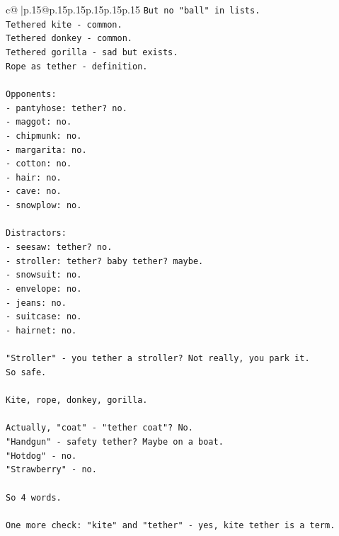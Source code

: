 \documentclass{article}
\begin{document}
{\begin{supertabular}{c@{$\;$}|p{.15\linewidth}@{}p{.15\linewidth}p{.15\linewidth}p{.15\linewidth}p{.15\linewidth}p{.15\linewidth}}
{{{\texttt{But no "ball" in lists.} \\
\texttt{Tethered kite {-} common.} \\
\texttt{Tethered donkey {-} common.} \\
\texttt{Tethered gorilla {-} sad but exists.} \\
\texttt{Rope as tether {-} definition.} \\
\\ 
\texttt{Opponents:} \\
\texttt{{-} pantyhose: tether? no.} \\
\texttt{{-} maggot: no.} \\
\texttt{{-} chipmunk: no.} \\
\texttt{{-} margarita: no.} \\
\texttt{{-} cotton: no.} \\
\texttt{{-} hair: no.} \\
\texttt{{-} cave: no.} \\
\texttt{{-} snowplow: no.} \\
\\ 
\texttt{Distractors:} \\
\texttt{{-} seesaw: tether? no.} \\
\texttt{{-} stroller: tether? baby tether? maybe.} \\
\texttt{{-} snowsuit: no.} \\
\texttt{{-} envelope: no.} \\
\texttt{{-} jeans: no.} \\
\texttt{{-} suitcase: no.} \\
\texttt{{-} hairnet: no.} \\
\\ 
\texttt{"Stroller" {-} you tether a stroller? Not really, you park it.} \\
\texttt{So safe.} \\
\\ 
\texttt{Kite, rope, donkey, gorilla.} \\
\\ 
\texttt{Actually, "coat" {-} "tether coat"? No.} \\
\texttt{"Handgun" {-} safety tether? Maybe on a boat.} \\
\texttt{"Hotdog" {-} no.} \\
\texttt{"Strawberry" {-} no.} \\
\\ 
\texttt{So 4 words.} \\
\\ 
\texttt{One more check: "kite" and "tether" {-} yes, kite tether is a term.} \\
}}}
\end{supertabular}}
\end{document}
